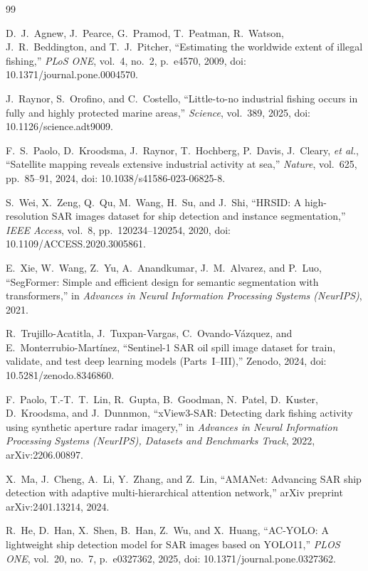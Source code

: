 \documentclass[a4paper,11pt]{article}
\begin{document}
\begin{thebibliography}{99}

D.~J.~Agnew, J.~Pearce, G.~Pramod, T.~Peatman, R.~Watson, J.~R.~Beddington, and T.~J.~Pitcher,
``Estimating the worldwide extent of illegal fishing,''
\textit{PLoS ONE}, vol.~4, no.~2, p.~e4570, 2009, doi: 10.1371/journal.pone.0004570.

J.~Raynor, S.~Orofino, and C.~Costello,
``Little-to-no industrial fishing occurs in fully and highly protected marine areas,''
\textit{Science}, vol.~389, 2025, doi: 10.1126/science.adt9009.

F.~S.~Paolo, D.~Kroodsma, J.~Raynor, T.~Hochberg, P.~Davis, J.~Cleary, \textit{et al.},
``Satellite mapping reveals extensive industrial activity at sea,''
\textit{Nature}, vol.~625, pp.~85--91, 2024, doi: 10.1038/s41586-023-06825-8.

S.~Wei, X.~Zeng, Q.~Qu, M.~Wang, H.~Su, and J.~Shi,
``HRSID: A high-resolution SAR images dataset for ship detection and instance segmentation,''
\textit{IEEE Access}, vol.~8, pp.~120234--120254, 2020, doi: 10.1109/ACCESS.2020.3005861.

E.~Xie, W.~Wang, Z.~Yu, A.~Anandkumar, J.~M.~Alvarez, and P.~Luo,
``SegFormer: Simple and efficient design for semantic segmentation with transformers,''
in \textit{Advances in Neural Information Processing Systems (NeurIPS)}, 2021.

R.~Trujillo-Acatitla, J.~Tuxpan-Vargas, C.~Ovando-V\'{a}zquez, and E.~Monterrubio-Mart\'{i}nez,
``Sentinel-1 SAR oil spill image dataset for train, validate, and test deep learning models (Parts~I--III),''
Zenodo, 2024, doi: 10.5281/zenodo.8346860.

F.~Paolo, T.-T.~T.~Lin, R.~Gupta, B.~Goodman, N.~Patel, D.~Kuster, D.~Kroodsma, and J.~Dunnmon,
``xView3-SAR: Detecting dark fishing activity using synthetic aperture radar imagery,''
in \textit{Advances in Neural Information Processing Systems (NeurIPS), Datasets and Benchmarks Track}, 2022,
arXiv:2206.00897.

X.~Ma, J.~Cheng, A.~Li, Y.~Zhang, and Z.~Lin,
``AMANet: Advancing SAR ship detection with adaptive multi-hierarchical attention network,''
arXiv preprint arXiv:2401.13214, 2024.

R.~He, D.~Han, X.~Shen, B.~Han, Z.~Wu, and X.~Huang,
``AC-YOLO: A lightweight ship detection model for SAR images based on YOLO11,''
\textit{PLOS ONE}, vol.~20, no.~7, p.~e0327362, 2025, doi: 10.1371/journal.pone.0327362.


\end{thebibliography}
\end{document}
